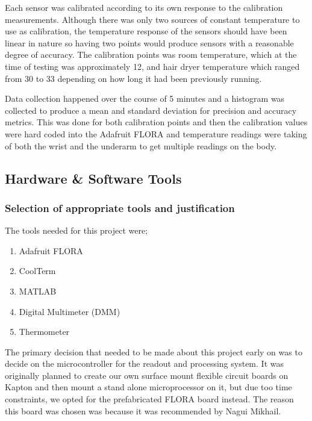 \documentclass[12pt,a4paper]{report}
\begin{document}
Each sensor was calibrated according to its own response to the calibration measurements. Although there was only two sources of constant temperature to use as calibration, the temperature response of the sensors should have been linear in nature so having two points would produce sensors with a reasonable degree of accuracy. The calibration points was room temperature, which at the time of testing was approximately 12\textcelsius{}, and hair dryer temperature which ranged from 30\textcelsius{} to 33\textcelsius{} depending on how long it had been previously running.\par

Data collection happened over the course of 5 minutes and a histogram was collected to produce a mean and standard deviation for precision and accuracy metrics. This was done for both calibration points and then the calibration values were hard coded into the Adafruit FLORA and temperature readings were taking of both the wrist and the underarm to get multiple readings on the body.



\subsection{Hardware \& Software Tools}
    \subsubsection{Selection of appropriate tools and justification}
    
    The tools needed for this project were;
    
    \renewcommand{\theenumi}{\arabic{enumi}}
    \begin{enumerate}
        \item Adafruit FLORA
        \item CoolTerm
        \item MATLAB
        \item Digital Multimeter (DMM)
        \item Thermometer
    \end{enumerate}
    
    The primary decision that needed to be made about this project early on was to decide on the microcontroller for the readout and processing system. It was originally planned to create our own surface mount flexible circuit boards on Kapton and then mount a stand alone microprocessor on it, but due too time constraints, we opted for the prefabricated FLORA board instead. The reason this board was chosen was because it was recommended by Nagui Mikhail. 
        
\end{document}

